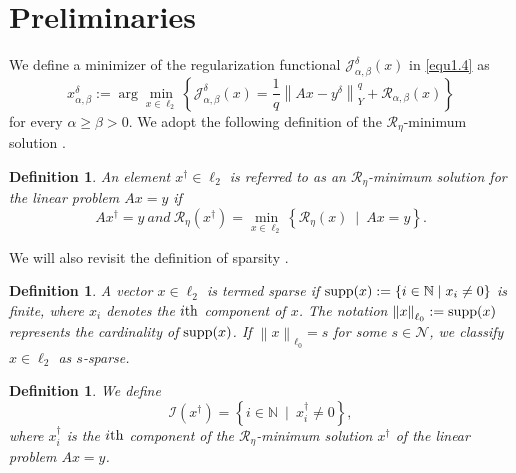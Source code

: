 \documentclass[a4paper,12pt]{article}
\newtheorem{definition}[theorem]{Definition}
\numberwithin{equation}{section}
\begin{document}
\section{Preliminaries}\label{sec2}

\par We define a minimizer of the regularization functional $\mathcal{J}_{\alpha,\beta}^{\delta}(x)$ in \eqref{equ1.4} as
\begin{equation}\label{equ2.1}
    x_{\alpha,\beta}^{\delta}:=\arg\min_{x\in\ell_{2}}\left\{\mathcal{J}_{\alpha,\beta}^{\delta}(x)= \frac{1}{q}\left\|Ax-y^{\delta}\right\|_{Y}^{q}+\mathcal{R}_{\alpha,\beta}(x)\right\}
\end{equation}
for every $\alpha\geq\beta> 0$. We adopt the following definition of the $\mathcal{R}_{\eta}$-minimum solution \cite{EHN96}.

\begin{definition}\label{def2.1}
    An element $x^{\dagger}\in\ell_{2}$ is referred to as an $\mathcal{R}_{\eta}$-minimum solution for the linear problem $Ax=y$ if
    \begin{equation*}
        Ax^{\dagger}=y\ and\ \mathcal{R}_{\eta}\left(x^{\dagger}\right)=\min_{x\in\ell_{2}}\left\{\mathcal{R}_{\eta}(x)\ \mid\ Ax=y \right\}.
    \end{equation*}
\end{definition}

\par We will also revisit the definition of sparsity \cite{DDD04}.

\begin{definition}\label{def2.2}
     A vector $x\in\ell_{2}$ is termed sparse if ${\rm supp}(x):=\left\{i\in\mathbb{N} \mid x_{i}\neq 0\right\}$ is finite, where $x_{i}$ denotes the $i{\rm th}$ component of $x$. The notation $\left\|x\right\|_{\ell_{0}}:={\rm supp}(x)$ represents the cardinality of ${\rm supp}(x)$. If $\left\|x\right\|_{\ell_{0}}=s$ for some $s\in\mathcal{N}$, we classify $x\in\ell_{2}$ as $s$-sparse.
\end{definition}

\begin{definition}\label{def2.3}
    We define
    \begin{equation*}
        \mathcal{I}(x^{\dagger})=\left\{i\in\mathbb{N}\ \mid\ x_{i}^{\dagger}\neq 0\right\},
    \end{equation*}
    where $x_{i}^{\dagger}$ is the $i{\rm th}$ component of the $\mathcal{R}_{\eta}$-minimum solution $x^{\dagger}$ of the linear problem $Ax=y$.
\end{definition}
\end{document}
